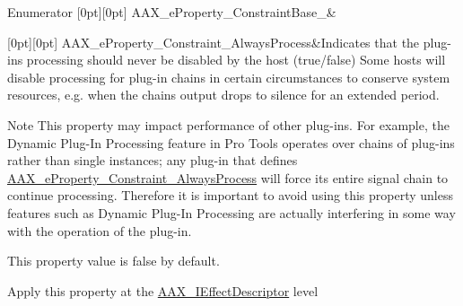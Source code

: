 \begin{DoxyEnumFields}{Enumerator}
[0pt][0pt]{}\mbox{\label{a00662_a13e384f22825afd3db6d68395b79ce0da979c0a2eb5859ec416705f5be73e98e8}} 
A\+A\+X\+\_\+e\+Property\+\_\+\+Constraint\+Base\+\_&\\
\hline

[0pt][0pt]{}\mbox{\label{a00662_a13e384f22825afd3db6d68395b79ce0da510e79713c2f14ebb0a50ed2ab0ff679}} 
A\+A\+X\+\_\+e\+Property\+\_\+\+Constraint\+\_\+\+Always\+Process&Indicates that the plug-\/in\textquotesingle{}s processing should never be disabled by the host ({\ttfamily true/{\ttfamily false})} Some hosts will disable processing for plug-\/in chains in certain circumstances to conserve system resources, e.\+g. when the chains\textquotesingle{} output drops to silence for an extended period.

\begin{DoxyNote}{Note}
This property may impact performance of other plug-\/ins. For example, the Dynamic Plug-\/\+In Processing feature in Pro Tools operates over chains of plug-\/ins rather than single instances; any plug-\/in that defines \mbox{\hyperlink{a00662_a13e384f22825afd3db6d68395b79ce0da510e79713c2f14ebb0a50ed2ab0ff679}{A\+A\+X\+\_\+e\+Property\+\_\+\+Constraint\+\_\+\+Always\+Process}} will force its entire signal chain to continue processing. Therefore it is important to avoid using this property unless features such as Dynamic Plug-\/\+In Processing are actually interfering in some way with the operation of the plug-\/in.
\end{DoxyNote}
\begin{DoxyItemize}
\item This property value is false by default. \item Apply this property at the \mbox{\hyperlink{a01813}{A\+A\+X\+\_\+\+I\+Effect\+Descriptor}} level \end{DoxyItemize}
\\
\hline


\end{DoxyEnumFields}
